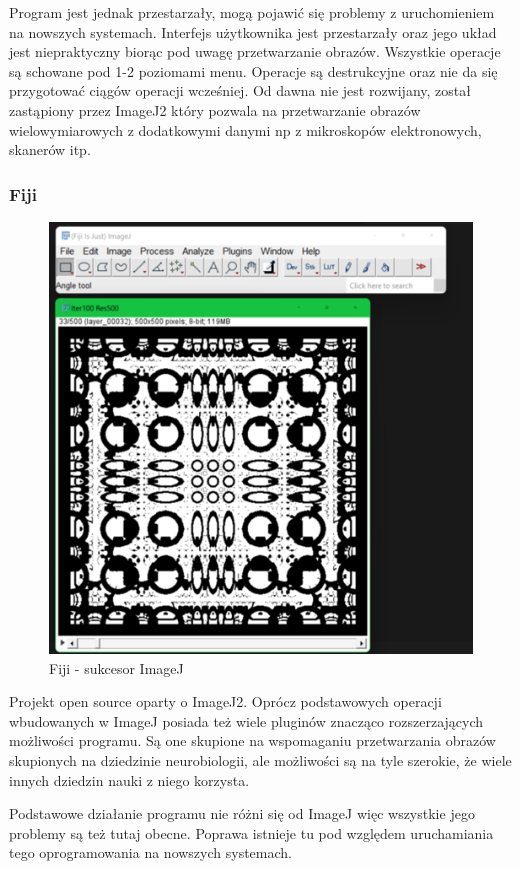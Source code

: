 Program jest jednak przestarzały, mogą pojawić się problemy z uruchomieniem na nowszych systemach. Interfejs użytkownika jest przestarzały oraz jego układ jest niepraktyczny biorąc pod uwagę przetwarzanie obrazów. 
Wszystkie operacje są schowane pod 1-2 poziomami menu. Operacje są destrukcyjne oraz nie da się przygotować ciągów operacji wcześniej. 
Od dawna nie jest rozwijany, został zastąpiony przez ImageJ2 który pozwala na przetwarzanie obrazów wielowymiarowych z dodatkowymi danymi np z mikroskopów elektronowych, skanerów itp.

\subsubsection{Fiji}
\begin{figure}[H]
    \centering
    \includegraphics[width=0.8\linewidth]{./images/Picture4.png}
    \caption{Fiji - sukcesor ImageJ}
    \label{fig:fiji}
\end{figure}
Projekt open source oparty o ImageJ2. Oprócz podstawowych operacji wbudowanych w ImageJ posiada też wiele pluginów znacząco rozszerzających możliwości programu. 
Są one skupione na wspomaganiu przetwarzania obrazów skupionych na dziedzinie neurobiologii, ale możliwości są na tyle szerokie, że wiele innych dziedzin nauki z niego korzysta.

Podstawowe działanie programu nie różni się od ImageJ więc wszystkie jego problemy są też tutaj obecne. Poprawa istnieje tu pod względem uruchamiania tego oprogramowania na nowszych systemach.

